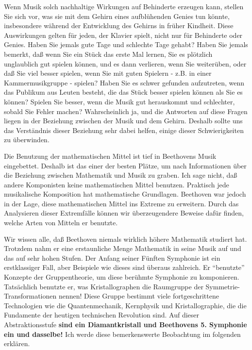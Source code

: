 Wenn Musik solch nachhaltige Wirkungen auf Behinderte erzeugen kann, stellen Sie sich vor, was sie mit dem Gehirn eines aufblühenden Genies tun könnte, insbesondere während der Entwicklung des Gehirns in früher Kindheit.
Diese Auswirkungen gelten für jeden, der Klavier spielt, nicht nur für Behinderte oder Genies.
Haben Sie jemals gute Tage und schlechte Tage gehabt?
Haben Sie jemals bemerkt, daß wenn Sie ein Stück das erste Mal lernen, Sie es plötzlich unglaublich gut spielen können, und es dann verlieren, wenn Sie weiterüben, oder daß Sie viel besser spielen, wenn Sie mit guten Spielern - z.B. in einer Kammermusikgruppe - spielen?
Haben Sie es schwer gefunden aufzutreten, wenn das Publikum aus Leuten besteht, die das Stück besser spielen können als Sie es können?
Spielen Sie besser, wenn die Musik gut herauskommt und schlechter, sobald Sie Fehler machen?
Wahrscheinlich ja, und die Antworten auf diese Fragen liegen in der Beziehung zwischen der Musik und dem Gehirn.
Deshalb sollte uns das Verständnis dieser Beziehung sehr dabei helfen, einige dieser Schwierigkeiten zu überwinden.


\label{c1iv4Gruppe}

Die Benutzung der mathematischen Mittel ist tief in Beethovens Musik eingebettet.
Deshalb ist das einer der besten Plätze, um nach Informationen über die Beziehung zwischen Mathematik und Musik zu graben.
Ich sage nicht, daß andere Komponisten keine mathematischen Mittel benutzen.
Praktisch jede musikalische Komposition hat mathematische Grundlagen.
Beethoven war jedoch in der Lage, diese mathematischen Mittel ins Extreme zu erweitern.
Durch das Analysieren dieser Extremfälle können wir überzeugendere Beweise dafür finden, welche Arten von Mitteln er benutzte.

Wir wissen alle, daß Beethoven niemals wirklich höhere Mathematik studiert hat.
Trotzdem nahm er eine erstaunliche Menge Mathematik in seine Musik auf und das auf sehr hohen Stufen.
Der Anfang seiner Fünften Symphonie ist ein erstklassiger Fall, aber Beispiele wie dieses sind überaus zahlreich.
Er \enquote{benutzte} Konzepte der Gruppentheorie, um diese berühmte Symphonie zu komponieren.
Tatsächlich benutzte er, was Kristallographen die Raumgruppe der Symmetrie-Transformationen nennen!
Diese Gruppe bestimmt viele fortgeschrittene Technologien wie die Quantenmechanik, Kernphysik und Kristallographie, die die Fundamente der heutigen technischen Revolution sind.
Auf dieser Abstraktionsstufe \textbf{sind ein Diamantkristall und Beethovens 5. Symphonie ein und dasselbe!}
Ich werde diese bemerkenswerte Beobachtung im folgenden erklären.

